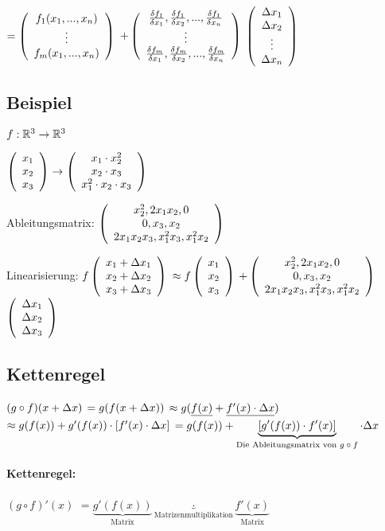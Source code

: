 $=   \left(  \begin{array}{c} f_1(x_1,...,x_n)\\\vdots\\f_m(x_1,...,x_n) \end{array}  \right)   $
$+   \left(  \begin{array}{c} \frac{\delta f_1}{\delta x_1}, \frac{\delta f_1}{\delta x_2}, ..., \frac{\delta f_1}{\delta x_n}\\ \vdots\\\frac{\delta f_m}{\delta x_1}, \frac{\delta f_m}{\delta x_2}, ..., \frac{\delta f_m}{\delta x_n} \end{array}  \right)  $
$  \left(  \begin{array}{c} \Delta x_1\\\Delta x_2\\\vdots\\\Delta x_n \end{array}  \right)  $ 

\subsection{Beispiel}
$f : \mathbb{R}^3 \rightarrow \mathbb{R}^3$

$  \left(  \begin{array}{c} x_1\\x_2\\x_3 \end{array}  \right)   \rightarrow   \left(  \begin{array}{c} x_1 \cdot x_2^2\\ x_2 \cdot x_3 \\ x_1^2 \cdot x_2 \cdot x_3 \end{array}  \right)  $

Ableitungsmatrix: 
$  \left(  \begin{array}{c} x_2^2, 2x_1 x_2, 0\\ 0, x_3, x_2\\2 x_1 x_2 x_3, x_1^2 x_3, x_1^2 x_2 \end{array}  \right)  $

Linearisierung: 
$f   \left(  \begin{array}{c} x_1 + \Delta x_1\\ x_2 + \Delta x_2\\ x_3 + \Delta x_3 \end{array}  \right)  $
$\approx f  \left(  \begin{array}{c} x_1\\ x_2 \\ x_3	 \end{array}  \right)  $
$+  \left(  \begin{array}{c} x_2^2, 2x_1 x_2, 0\\ 0, x_3, x_2\\2 x_1 x_2 x_3, x_1^2 x_3, x_1^2 x_2 \end{array}  \right)  $
$  \left(  \begin{array}{c} \Delta x_1\\ \Delta x_2\\ \Delta x_3 \end{array}  \right)  $

\subsection{Kettenregel}
$ (g\circ f) (x+\Delta x) $
$=g(f(x+\Delta x))$
$\approx g(\underline{f(x)} + \underline{f'(x) \cdot \Delta x})$
$\approx g(f(x)) + g'(f(x)) \cdot [f'(x) \cdot \Delta x]$
$= g(f(x)) + \underbrace{[g'(f(x)) \cdot f'(x)]}_{\textrm{Die Ableitungsmatrix von $g\circ f$}} \cdot \Delta x$

\paragraph{Kettenregel:}
$(g\circ f)'(x)$
$=\underbrace{g'(f(x))}_{\textrm{Matrix}} \underbrace{\cdot}_{\textrm{Matrizenmultiplikation}} \underbrace{f'(x)}_{\textrm{Matrix}}$

